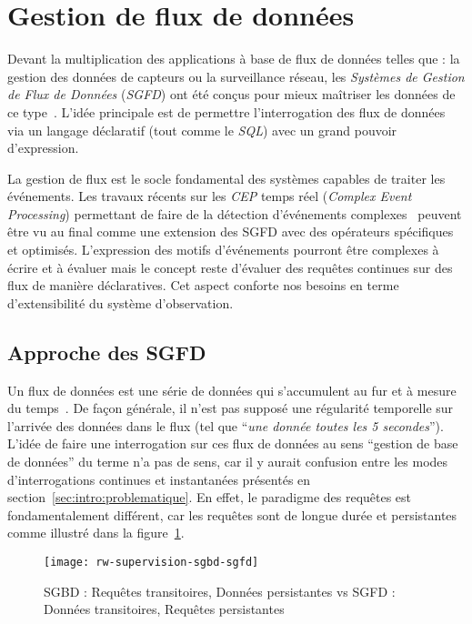 \section{Gestion de flux de données}\label{sec:rw:supervision:datastream}
Devant la multiplication des applications à base de flux de données telles que : la gestion des données de capteurs ou la surveillance réseau, les \textit{Systèmes de Gestion de Flux de Données} (\textit{SGFD}) ont été conçus pour mieux maîtriser les données de ce type~\cite{Madden:tag, Yao:cougar, Cranor:gigascope}. L'idée principale est de permettre l'interrogation des flux de données via un langage déclaratif (tout comme le \textit{SQL}) avec un grand pouvoir d'expression.

La gestion de flux est le socle fondamental des systèmes capables de traiter les événements. Les travaux récents sur les \textit{CEP} temps réel (\textit{Complex Event Processing}) permettant de faire de la détection d'événements complexes~\cite{Brenna:cayuga} peuvent être vu au final comme une extension des SGFD avec des opérateurs spécifiques et optimisés. L'expression des motifs d'événements pourront être complexes à écrire et à évaluer mais le concept reste d'évaluer des requêtes continues sur des flux de manière déclaratives. Cet aspect conforte nos besoins en terme d'extensibilité du système d'observation.

\subsection{Approche des SGFD}
Un flux de données est une série de données qui s'accumulent au fur et à mesure du temps~\cite{Golab:issues}. De façon générale, il n'est pas supposé une régularité temporelle sur l'arrivée des données dans le flux (tel que \enquote{\it une donnée toutes les 5 secondes}). L'idée de faire une interrogation sur ces flux de données au sens \enquote{gestion de base de données} du terme n'a pas de sens, car il y aurait confusion entre les modes d'interrogations continues et instantanées présentés en section~\ref{sec:intro:problematique}. En effet, le paradigme des requêtes est fondamentalement différent, car les requêtes sont de longue durée et persistantes~\cite{Chen:niagaracq} comme illustré dans la figure~\ref{fig:rw:supervision:sgbd-sgfd}.
\begin{figure}[ht]
    \centering
    \texttt{[image: rw-supervision-sgbd-sgfd]}
    \caption{SGBD : Requêtes transitoires, Données persistantes vs SGFD : Données transitoires, Requêtes persistantes~\protect\cite{Gurgen:sstreamware}}\label{fig:rw:supervision:sgbd-sgfd}
\end{figure}

